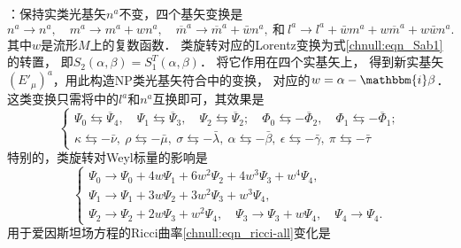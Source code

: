 \noindent{}：保持实类光基矢$n^a$不变，四个基矢变换是
\begin{equation*}
    n^a\to n^a,\quad m^a \to m^a + w n^a, \quad \overline{m}^a \to \overline{m}^a + \bar{w} n^a,
    \ \text{和}\ l^a \to l^a + \bar{w} m^a + w \overline{m}^a + w\bar{w} n^a .
\end{equation*}
其中$w$是流形$M$上的复数函数．
类旋转对应的Lorentz变换为式\eqref{chnull:eqn_Sab1}的{\kaishu 转置}，
即$S_2( {\alpha ,\beta } ) = S_1^T( {\alpha ,\beta } )$．
将它作用在四个实基矢上，
得到新实基矢$(E'_\mu)^a$，用此构造NP类光基矢符合中的变换，
对应的$w=\alpha -\mathbbm{i} \beta$．
这类变换只需将中的$l^a$和$n^a$互换即可，其效果是
\begin{equation}\label{chnull:eqn_Weyl-Spin-II}
    \begin{cases}
        \Psi_0 \leftrightarrows \overline{\Psi}_4 ,\quad
        \Psi_1 \leftrightarrows \overline{\Psi}_3 ,\quad
        \Psi_2 \leftrightarrows \overline{\Psi}_2 ;\quad
        \Phi_0 \leftrightarrows -\overline{\Phi}_2 ,\quad
        \Phi_1 \leftrightarrows -\overline{\Phi}_1 ;\\
        \kappa \leftrightarrows -\bar{\nu}, \
        \rho   \leftrightarrows -\bar{\mu}, \
        \sigma \leftrightarrows -\bar{\lambda}, \
        \alpha \leftrightarrows -\bar{\beta},\
        \epsilon\leftrightarrows-\bar{\gamma},\
        \pi    \leftrightarrows -\bar{\tau}
    \end{cases}
\end{equation}
特别的，\fbox{乙}类旋转对Weyl标量的影响是
\begin{equation}\label{chnull:eqn_Weyl-II}
    \begin{cases}
        \Psi_{0} \to \Psi_{0} + 4 w \Psi_{1} + 6 w^2 \Psi_{2}
        + 4 w^3 \Psi_{3} + w^4 \Psi_{4}, \\
        \Psi_{1} \to \Psi_{1} + 3 w \Psi_{2} + 3 w^2 \Psi_{3} + w^3 \Psi_{4}, \\
        \Psi_{2} \to \Psi_{2} + 2 w \Psi_{3} + w^2 \Psi_{4}, \quad
        \Psi_{3} \to \Psi_{3} + w \Psi_{4}, \quad \Psi_{4} \to \Psi_{4} .
    \end{cases}
\end{equation}
用于爱因斯坦场方程的Ricci曲率\eqref{chnull:eqn_ricci-all}变化是
